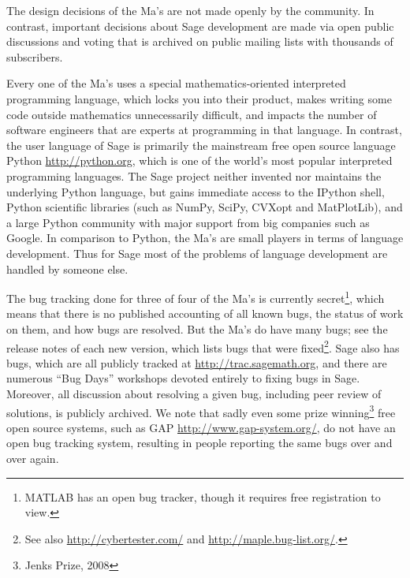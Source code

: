 \documentclass[multi]{cambridge7A}
\theoremstyle{plain}%
\theoremstyle{definition}
\begin{document}
The design decisions of the Ma's are not made openly by the community.
In contrast, important decisions about Sage development are made via
open public discussions and voting that is archived on public mailing lists
with thousands of subscribers.


Every one of the Ma's uses a special mathematics-oriented interpreted
programming language, which locks you into their product, makes
writing some code outside mathematics unnecessarily difficult, and impacts the
number of software engineers that are experts at programming in that
language.  In contrast, the user language of Sage is primarily the
mainstream free open source language Python \url{http://python.org},
which is one of the world's most popular interpreted programming
languages.  The Sage project neither invented nor maintains the
underlying Python language, but gains immediate access to the IPython
shell, Python scientific libraries (such as NumPy, SciPy, CVXopt and
MatPlotLib), and a large Python community with major support from big
companies such as Google. In comparison to Python, the Ma's are small
players in terms of language development.  Thus for Sage most of the
problems of language development are handled by someone else.


The bug tracking done for three of four of the Ma's is
currently secret\footnote{MATLAB has an open bug tracker,
though it requires free registration to view.
}, which means that there is no published accounting of all known bugs, the status
of work on them, and how bugs are resolved.  But the Ma's do have many
bugs; see the release notes of each new version, which
lists bugs that were fixed\footnote{See also
  \url{http://cybertester.com/} and
  \url{http://maple.bug-list.org/}.}.  Sage also has bugs,
which are all publicly tracked at
\url{http://trac.sagemath.org}, and there are numerous ``Bug
Days'' workshops devoted entirely to fixing bugs in Sage.  Moreover,
all discussion about resolving a given bug, including peer review of
solutions, is publicly archived.  We note that sadly even some prize
winning\footnote{Jenks Prize, 2008} free open source systems, such as
GAP \url{http://www.gap-system.org/}, do not have an open bug tracking
system, resulting in people reporting the same bugs over and over
again.
\end{document}
